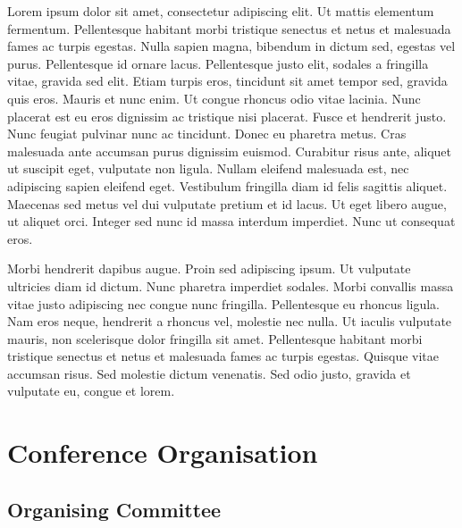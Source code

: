 \documentclass[a4paper,UKenglish]{oasicsmaster-v2016}
\begin{document}
Lorem ipsum dolor sit amet, consectetur adipiscing elit. Ut mattis
elementum fermentum. Pellentesque habitant morbi tristique senectus et
netus et malesuada fames ac turpis egestas. Nulla sapien magna,
bibendum in dictum sed, egestas vel purus. Pellentesque id ornare
lacus. Pellentesque justo elit, sodales a fringilla vitae, gravida sed
elit. Etiam turpis eros, tincidunt sit amet tempor sed, gravida quis
eros. Mauris et nunc enim. Ut congue rhoncus odio vitae lacinia. Nunc
placerat est eu eros dignissim ac tristique nisi placerat. Fusce et
hendrerit justo. Nunc feugiat pulvinar nunc ac tincidunt. Donec eu
pharetra metus. Cras malesuada ante accumsan purus dignissim
euismod. Curabitur risus ante, aliquet ut suscipit eget, vulputate non
ligula. Nullam eleifend malesuada est, nec adipiscing sapien eleifend
eget. Vestibulum fringilla diam id felis sagittis aliquet. Maecenas
sed metus vel dui vulputate pretium et id lacus. Ut eget libero augue,
ut aliquet orci. Integer sed nunc id massa interdum imperdiet. Nunc ut
consequat eros.

Morbi hendrerit dapibus augue. Proin sed adipiscing ipsum. Ut
vulputate ultricies diam id dictum. Nunc pharetra imperdiet
sodales. Morbi convallis massa vitae justo adipiscing nec congue nunc
fringilla. Pellentesque eu rhoncus ligula. Nam eros neque, hendrerit a
rhoncus vel, molestie nec nulla. Ut iaculis vulputate mauris, non
scelerisque dolor fringilla sit amet. Pellentesque habitant morbi
tristique senectus et netus et malesuada fames ac turpis
egestas. Quisque vitae accumsan risus. Sed molestie dictum
venenatis. Sed odio justo, gravida et vulputate eu, congue et lorem. 

\chapter{Conference Organisation}

\section*{Organising Committee}
\end{document}
